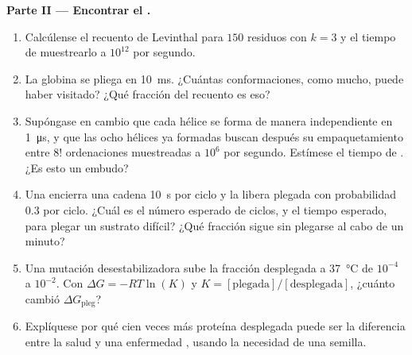 \begin{problem}
\medskip
\noindent\textbf{Parte II --- Encontrar el .}
\begin{enumerate}[resume]
  \item Calcúlense el recuento de Levinthal para $150$ residuos con
        $k = 3$ y el tiempo de muestrearlo a $10^{12}$ por segundo.
  \item La globina se pliega en \qty{10}{ms}. ¿Cuántas conformaciones,
        como mucho, puede haber visitado? ¿Qué fracción del recuento es
        eso?
  \item Supóngase en cambio que cada hélice se forma de manera
        independiente en \qty{1}{\micro s}, y que las ocho hélices ya
        formadas buscan después su empaquetamiento entre $8!$
        ordenaciones muestreadas a $10^{6}$ por segundo. Estímese el
        tiempo de . ¿Es esto un embudo?
  \item Una  encierra una cadena \qty{10}{s} por ciclo y la
        libera plegada con probabilidad $0.3$ por ciclo. ¿Cuál es el
        número esperado de ciclos, y el tiempo esperado, para plegar un
        sustrato difícil? ¿Qué fracción sigue sin plegarse al cabo de un
        minuto?
  \item Una mutación desestabilizadora sube la fracción desplegada a
        \qty{37}{\celsius} de $10^{-4}$ a $10^{-2}$. Con $\Delta G =
        -RT\ln(K)$ y $K = [\text{plegada}]/[\text{desplegada}]$, ¿cuánto
        cambió $\Delta G_{\text{pleg}}$?
  \item Explíquese por qué cien veces más proteína desplegada puede ser
        la diferencia entre la salud y una enfermedad , usando
        la necesidad de una semilla.
\end{enumerate}


\end{problem}
